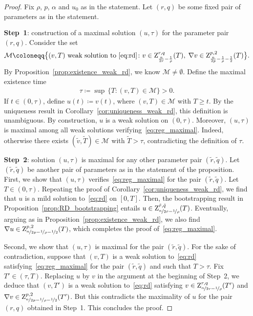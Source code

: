 \documentclass[11pt, leqno]{amsart}
\theoremstyle{definition}
\newcommand{\Z}{\mathrm{Z}}
\newcommand{\cM}{\mathcal{M}}
\begin{document}
	\begin{proof}
		Fix $\rho$, $p$, $\alpha$ and $u_0$ as in the statement. Let $(r,q)$ be some fixed pair of parameters as in the statement.

		\textbf{Step~1}: construction of a maximal solution $(u,\tau)$ for the parameter pair $(r,q)$. Consider the set
		\begin{align}
			\cM \coloneqq \bigl\{ (v,T) \text{ weak solution to } \eqref{eq:rd} \colon v \in \Z^{r,q}_{\frac{n}{2r} - \frac{1}{\rho}}(T), \; \nabla v \in \Z^{p,2}_{\frac{n}{2p} - \frac{1}{\rho} - \frac{1}{2}}(T) \bigr\}.
		\end{align}
		By Proposition~\ref{prop:existence_weak_rd}, we know $\cM \neq \emptyset$. Define the maximal existence time
		\begin{align}
			\tau \coloneqq \sup \, \bigl\{ T \colon (v,T) \in \cM \bigr\} > 0.
		\end{align}
		If $t \in (0,\tau)$, define $u(t) \coloneqq v(t)$, where $(v,T) \in \cM$ with $T \geq t$. By the uniqueness result in Corollary~\ref{cor:uniqueness_weak_rd}, this definition is unambiguous. By construction, $u$ is a weak solution on $(0,\tau)$. Moreover, $(u, \tau)$ is maximal among all weak solutions verifying~\eqref{eq:reg_maximal}. Indeed, otherwise there exists $(\tilde v, \tilde T) \in \cM$ with $\tilde T>\tau$, contradicting the definition of $\tau$.

		\textbf{Step~2}: solution $(u,\tau)$ is maximal for any other parameter pair $(\tilde r, \tilde q)$. Let $(\tilde r, \tilde q)$ be another pair of parameters as in the statement of the proposition.
		First, we show that $(u,\tau)$ verifies~\eqref{eq:reg_maximal} for the pair $(\tilde r, \tilde q)$. Let $T \in (0,\tau)$. Repeating the proof of Corollary~\ref{cor:uniqueness_weak_rd}, we find that $u$ is a mild solution to~\eqref{eq:rd} on $[0,T]$. Then, the bootstrapping result in Proposition~\ref{prop:RD_bootstrapping} entails $u \in \Z^{\tilde r,\tilde q}_{\nicefrac{n}{2\tilde r} - \nicefrac{1}{\rho}}(T)$. Eventually, arguing as in Proposition~\ref{prop:existence_weak_rd}, we also find $\nabla u \in \Z^{p,2}_{\nicefrac{n}{2p} - \nicefrac{1}{\rho} - \nicefrac{1}{2}}(T)$, which completes the proof of~\eqref{eq:reg_maximal}.

		Second, we show that $(u,\tau)$ is maximal for the pair $(\tilde r, \tilde q)$. For the sake of contradiction, suppose that $(v,T)$ is a weak solution to~\eqref{eq:rd} satisfying~\eqref{eq:reg_maximal} for the pair $(\tilde r, \tilde q)$ and such that $T > \tau$. Fix $T' \in (\tau, T)$. Replacing $u$ by $v$ in the argument at the beginning of Step~2, we deduce that $(v, T')$ is a weak solution to~\eqref{eq:rd} satisfying $v\in \Z^{r,q}_{\nicefrac{n}{2r} - \nicefrac{1}{\rho}}(T')$ and $\nabla v \in \Z^{p,2}_{\nicefrac{n}{2p} - \nicefrac{1}{\rho} - \nicefrac{1}{2}}(T')$. But this contradicts the maximality of $u$ for the pair $(r,q)$ obtained in Step~1. This concludes the proof.
	\end{proof}
\end{document}
